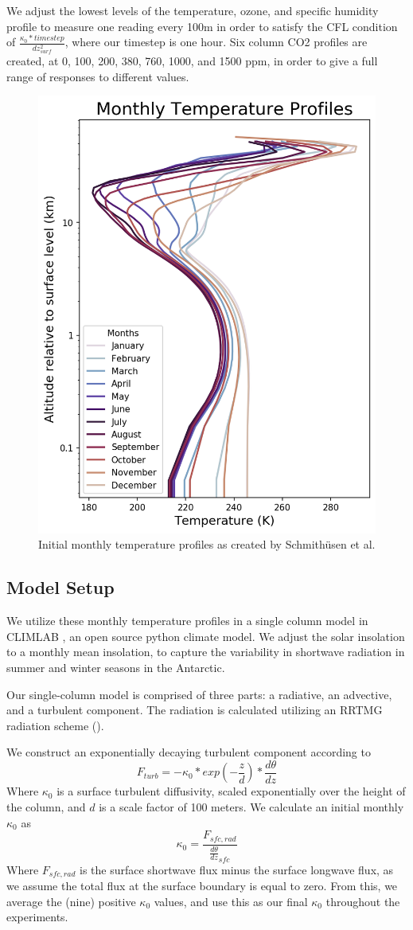\documentclass[12]{article}
\begin{document}
 We adjust the lowest levels of the temperature, ozone, and specific humidity profile to measure one reading every 100m in order to satisfy the CFL condition of $\frac{\kappa_0*timestep}{dz^2_{surf}}$, where our timestep is one hour. Six column CO2 profiles are created, at 0, 100, 200, 380, 760, 1000, and 1500 ppm, in order to give a full range of responses to different values. 

\begin{figure}[htb!]
\noindent\includegraphics[width=.5\textwidth]{figures/initial_temperature_profiles.png}
\centering
\caption{Initial monthly temperature profiles as created by Schmithüsen et al.}
\label{fig:temperature_profiles}
\end{figure}

\subsection{Model Setup}
We utilize these monthly temperature profiles in a single column model in CLIMLAB \citep{rose_climlab_2018}, an open source python climate model. We adjust the solar insolation to a monthly mean insolation, to capture the variability in shortwave radiation in summer and winter seasons in the Antarctic. 

Our single-column model is comprised of three parts: a radiative, an advective, and a turbulent component. The radiation is calculated utilizing an RRTMG radiation scheme (). 

We construct an exponentially decaying turbulent component according to
\begin{equation}
    F_{turb} = -\kappa_0*exp(-\frac{z}{d})*\frac{d\theta}{dz}
\end{equation}
Where $\kappa_0$ is a surface turbulent diffusivity, scaled exponentially over the height of the column, and $d$ is a scale factor of 100 meters. We calculate an initial monthly $\kappa_0$ as
\begin{equation}
    \kappa_0 = \frac{F_{sfc, rad}}{\frac{d\theta}{dz}_{sfc}}
\end{equation}
Where $F_{sfc, rad}$ is the surface shortwave flux minus the surface longwave flux, as we assume the total flux at the surface boundary is equal to zero. From this, we average the (nine) positive $\kappa_0$ values, and use this as our final $\kappa_0$ throughout the experiments.
\end{document}
